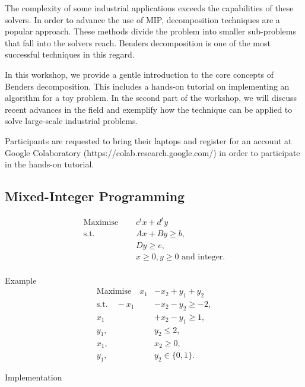 The complexity of some industrial applications exceeds the capabilities of these solvers. In order to advance the use of MIP, decomposition techniques are a popular approach. These methods divide the problem into smaller sub-problems that fall into the solvers reach. Benders decomposition is one of the most successful techniques in this regard.

In this workshop, we provide a gentle introduction to the core concepts of Benders decomposition. This includes a hands-on tutorial on implementing an algorithm for a toy problem. In the second part of the workshop, we will discuss recent advances in the field and exemplify how the technique can be applied to solve large-scale industrial problems.

Participants are requested to bring their laptops and register for an account at Google Colaboratory (https://colab.research.google.com/) in order to participate in the hands-on tutorial.

\vfill

\newpage





\subsection*{Mixed-Integer Programming}

\vfill

\begin{align*}
\textrm{Maximise } \quad &  c^tx + d^ty \\
\textrm{s.t.} \quad & Ax + By \geq b, \\
& Dy \geq e, \\
& x {\geq 0},  y {\geq 0} \textrm{ and integer}.\\
\end{align*}
%
\vfill
\begin{bclogo}[logo=\bccrayon]{\small Example } \small
\vspace{-0.5cm}
\begin{align*}
\textrm{Maximise} \quad   x_1 &- x_2 + y_1 + y_2 \\
\textrm{s.t.} \quad  -x_1 & - x_2 - y_2 \geq -2, \\
 x_1  &+ x_2 - y_1 \geq 1, \\
y_1, & y_2 \leq 2, \\
 x_1, & x_2 \geq 0, \\
 y_1, & y_2 \in \{0,1\}.
\end{align*}
\end{bclogo}
\vfill
\begin{bclogo}[logo=\bcinfo, barre=none ]{\small Implementation}
\vspace{0.2cm}

\end{bclogo}
\vfill


